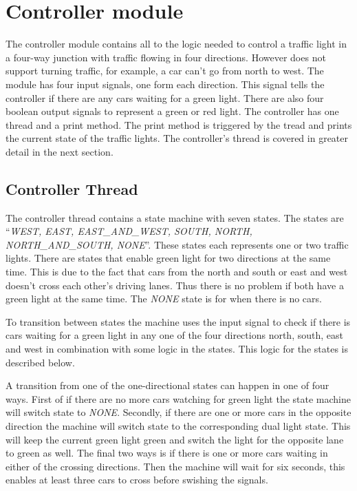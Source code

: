 \section{Controller module}
The controller module contains all to the logic needed to control a traffic light in a four-way junction with traffic flowing in four directions. However does not support turning traffic, for example, a car can't go from north to west. The module has four input signals, one form each direction. This signal tells the controller if there are any cars waiting for a green light. There are also four boolean output signals to represent a green or red light. The controller has one thread and a print method. The print method is triggered by the tread and prints the current state of the traffic lights. The controller's thread is covered in greater detail in the next section. 



\subsection{Controller Thread}
The controller thread contains a state machine with seven states. The states are ``\emph{WEST, EAST, EAST{\_}AND{\_}WEST, SOUTH, NORTH, NORTH{\_}AND{\_}SOUTH, NONE}''. These states each represents one or two traffic lights. There are states that enable green light for two directions at the same time. This is due to the fact that cars from the north and south or east and west doesn't cross each other's driving lanes. Thus there is no problem if both have a green light at the same time. The \emph{NONE} state is for when there is no cars.

To transition between states the machine uses the input signal to check if there is cars waiting for a green light in any one of the four directions north, south, east and west in combination with some logic in the states. This logic for the states is described below. 

A transition from one of the one-directional states can happen in one of four ways. First of if there are no more cars watching for green light the state machine will switch state to \emph{NONE}. Secondly, if there are one or more cars in the opposite direction the machine will switch state to the corresponding dual light state. This will keep the current green light green and switch the light for the opposite lane to green as well. The final two ways is if there is one or more cars waiting in either of the crossing directions. Then the machine will wait for six seconds, this enables at least three cars to cross before swishing the signals.

